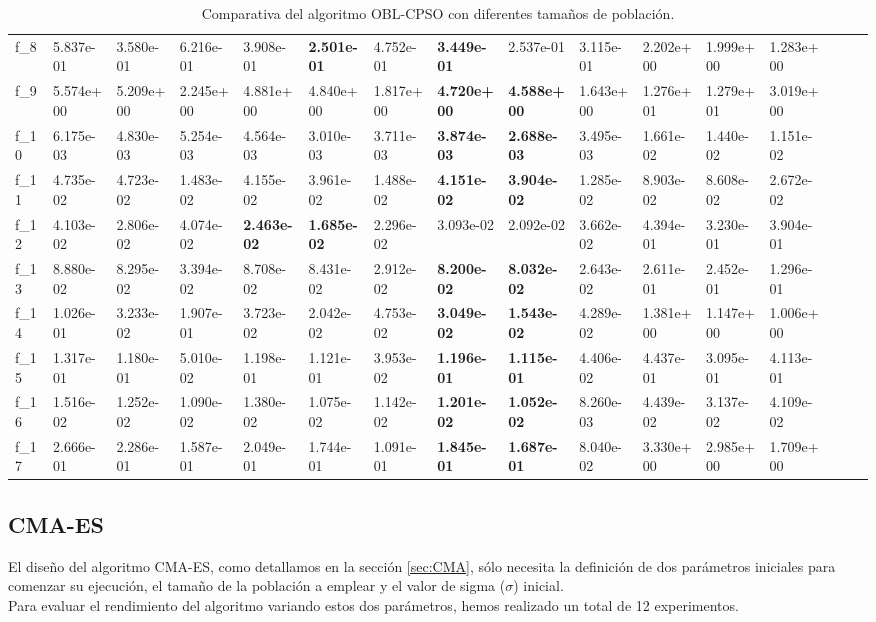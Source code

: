 \begin{table}[!ht]
{\begin{tabular}{LLLLLLLLLLLLLLLL}
f_{8} & 5.837e-01 & 3.580e-01 & 6.216e-01 & 3.908e-01 & {\bf 2.501e-01} & 4.752e-01 & {\bf 3.449e-01} & 2.537e-01 & 3.115e-01 & 2.202e+00 & 1.999e+00 & 1.283e+00 \\
f_{9} & 5.574e+00 & 5.209e+00 & 2.245e+00 & 4.881e+00 & 4.840e+00 & 1.817e+00 & {\bf 4.720e+00} & {\bf 4.588e+00} & 1.643e+00 & 1.276e+01 & 1.279e+01 & 3.019e+00 \\
f_{10} & 6.175e-03 & 4.830e-03 & 5.254e-03 & 4.564e-03 & 3.010e-03 & 3.711e-03 & {\bf 3.874e-03} & {\bf 2.688e-03} & 3.495e-03 & 1.661e-02 & 1.440e-02 & 1.151e-02 \\
f_{11} & 4.735e-02 & 4.723e-02 & 1.483e-02 & 4.155e-02 & 3.961e-02 & 1.488e-02 & {\bf 4.151e-02} & {\bf 3.904e-02} & 1.285e-02 & 8.903e-02 & 8.608e-02 & 2.672e-02 \\
f_{12} & 4.103e-02 & 2.806e-02 & 4.074e-02 & {\bf 2.463e-02} & {\bf 1.685e-02} & 2.296e-02 & 3.093e-02 & 2.092e-02 & 3.662e-02 & 4.394e-01 & 3.230e-01 & 3.904e-01 \\
f_{13} & 8.880e-02 & 8.295e-02 & 3.394e-02 & 8.708e-02 & 8.431e-02 & 2.912e-02 & {\bf 8.200e-02} & {\bf 8.032e-02} & 2.643e-02 & 2.611e-01 & 2.452e-01 & 1.296e-01 \\
f_{14} & 1.026e-01 & 3.233e-02 & 1.907e-01 & 3.723e-02 & 2.042e-02 & 4.753e-02 & {\bf 3.049e-02} & {\bf 1.543e-02} & 4.289e-02 & 1.381e+00 & 1.147e+00 & 1.006e+00 \\
f_{15} & 1.317e-01 & 1.180e-01 & 5.010e-02 & 1.198e-01 & 1.121e-01 & 3.953e-02 & {\bf 1.196e-01} & {\bf 1.115e-01} & 4.406e-02 & 4.437e-01 & 3.095e-01 & 4.113e-01 \\
f_{16} & 1.516e-02 & 1.252e-02 & 1.090e-02 & 1.380e-02 & 1.075e-02 & 1.142e-02 & {\bf 1.201e-02} & {\bf 1.052e-02} & 8.260e-03 & 4.439e-02 & 3.137e-02 & 4.109e-02 \\
f_{17} & 2.666e-01 & 2.286e-01 & 1.587e-01 & 2.049e-01 & 1.744e-01 & 1.091e-01 & {\bf 1.845e-01} & {\bf 1.687e-01} & 8.040e-02 & 3.330e+00 & 2.985e+00 & 1.709e+00 \\
    \bottomrule
    \end{tabular}}
    \captionsetup{justification=centering}
    \caption{Comparativa del algoritmo OBL-CPSO con diferentes tamaños de población.}    
\end{table}
\newpage
\subsection{CMA-ES}\label{sec:paramCMA_ES}

El diseño del algoritmo CMA-ES, como detallamos en la sección \ref{sec:CMA}, sólo necesita la definición de dos parámetros iniciales para comenzar su ejecución, el tamaño de la población a emplear y el valor de sigma ($\sigma$) inicial. \\ Para evaluar el rendimiento del algoritmo variando estos dos parámetros, hemos realizado un total de 12 experimentos. \\

